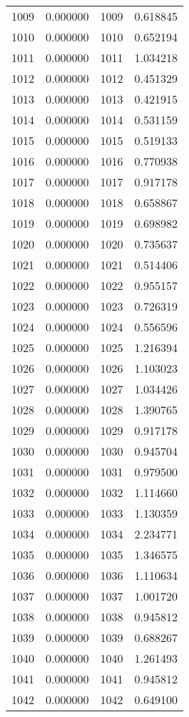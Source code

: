 \documentclass[12pt]{article}
\begin{document}
\begin{longtable}{@{}cccc@{}}
1009 & 0.000000 & 1009 & 0.618845 \\
1010 & 0.000000 & 1010 & 0.652194 \\
1011 & 0.000000 & 1011 & 1.034218 \\
1012 & 0.000000 & 1012 & 0.451329 \\
1013 & 0.000000 & 1013 & 0.421915 \\
1014 & 0.000000 & 1014 & 0.531159 \\
1015 & 0.000000 & 1015 & 0.519133 \\
1016 & 0.000000 & 1016 & 0.770938 \\
1017 & 0.000000 & 1017 & 0.917178 \\
1018 & 0.000000 & 1018 & 0.658867 \\
1019 & 0.000000 & 1019 & 0.698982 \\
1020 & 0.000000 & 1020 & 0.735637 \\
1021 & 0.000000 & 1021 & 0.514406 \\
1022 & 0.000000 & 1022 & 0.955157 \\
1023 & 0.000000 & 1023 & 0.726319 \\
1024 & 0.000000 & 1024 & 0.556596 \\
1025 & 0.000000 & 1025 & 1.216394 \\
1026 & 0.000000 & 1026 & 1.103023 \\
1027 & 0.000000 & 1027 & 1.034426 \\
1028 & 0.000000 & 1028 & 1.390765 \\
1029 & 0.000000 & 1029 & 0.917178 \\
1030 & 0.000000 & 1030 & 0.945704 \\
1031 & 0.000000 & 1031 & 0.979500 \\
1032 & 0.000000 & 1032 & 1.114660 \\
1033 & 0.000000 & 1033 & 1.130359 \\
1034 & 0.000000 & 1034 & 2.234771 \\
1035 & 0.000000 & 1035 & 1.346575 \\
1036 & 0.000000 & 1036 & 1.110634 \\
1037 & 0.000000 & 1037 & 1.001720 \\
1038 & 0.000000 & 1038 & 0.945812 \\
1039 & 0.000000 & 1039 & 0.688267 \\
1040 & 0.000000 & 1040 & 1.261493 \\
1041 & 0.000000 & 1041 & 0.945812 \\
1042 & 0.000000 & 1042 & 0.649100 \\

\end{longtable}
\end{document}
